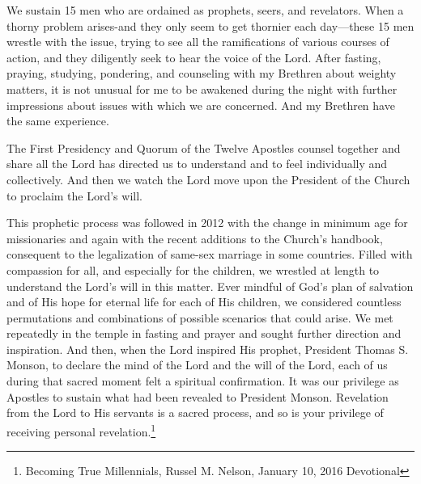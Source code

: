\begin{displayquote}
We sustain 15 men who are ordained as prophets, seers, and revelators. When a thorny 
problem arises-and they only seem to get thornier each day—these 15 men wrestle with 
the issue, trying to see all the ramifications of various courses of action, and they 
diligently seek to hear the voice of the Lord. After fasting, praying, studying, 
pondering, and counseling with my Brethren about weighty matters, it is not unusual 
for me to be awakened during the night with further impressions about issues with 
which we are concerned. And my Brethren have the same experience.

The First Presidency and Quorum of the Twelve Apostles counsel together and share 
all the Lord has directed us to understand and to feel individually and collectively. 
And then we watch the Lord move upon the President of the Church to proclaim the 
Lord's will.

This prophetic process was followed in 2012 with the change in minimum age for 
missionaries and again with the recent additions to the Church's handbook, 
consequent to the legalization of same-sex marriage in some countries. Filled with 
compassion for all, and especially for the children, we wrestled at length to 
understand the Lord’s will in this matter. Ever mindful of God's plan of salvation 
and of His hope for eternal life for each of His children, we considered countless 
permutations and combinations of possible scenarios that could arise. We met 
repeatedly in the temple in fasting and prayer and sought further direction and 
inspiration. And then, when the Lord inspired His prophet, President Thomas S. 
Monson, to declare the mind of the Lord and the will of the Lord, each of us during 
that sacred moment felt a spiritual confirmation. It was our privilege as Apostles 
to sustain what had been revealed to President Monson. Revelation from the Lord to 
His servants is a sacred process, and so is your privilege of receiving personal 
revelation.\footnote{Becoming True Millennials, Russel M. Nelson, January 10, 2016 
Devotional}
\end{displayquote}